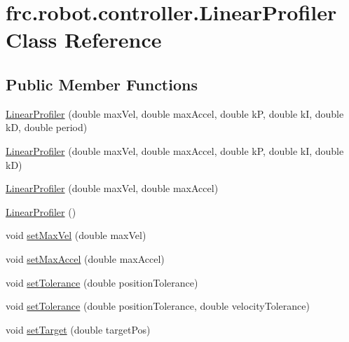 \hypertarget{classfrc_1_1robot_1_1controller_1_1_linear_profiler}{}\section{frc.\+robot.\+controller.\+Linear\+Profiler Class Reference}
\label{classfrc_1_1robot_1_1controller_1_1_linear_profiler}
\subsection*{Public Member Functions}
\begin{DoxyCompactItemize}
\item 
\mbox{\hyperlink{classfrc_1_1robot_1_1controller_1_1_linear_profiler_a1e7aab755a295a55c3753e77f5b0bdcd}{Linear\+Profiler}} (double max\+Vel, double max\+Accel, double kP, double kI, double kD, double period)
\item 
\mbox{\hyperlink{classfrc_1_1robot_1_1controller_1_1_linear_profiler_a2e9710450fc8f85c4afdf3829cdc9b2f}{Linear\+Profiler}} (double max\+Vel, double max\+Accel, double kP, double kI, double kD)
\item 
\mbox{\hyperlink{classfrc_1_1robot_1_1controller_1_1_linear_profiler_a4e604d041cf77ca66a712ec3c71dc470}{Linear\+Profiler}} (double max\+Vel, double max\+Accel)
\item 
\mbox{\hyperlink{classfrc_1_1robot_1_1controller_1_1_linear_profiler_aefed5cdaea96776a06cc5d20088bb2fc}{Linear\+Profiler}} ()
\item 
void \mbox{\hyperlink{classfrc_1_1robot_1_1controller_1_1_linear_profiler_a4c9134a6d34c837608dd45bbef48ef85}{set\+Max\+Vel}} (double max\+Vel)
\item 
void \mbox{\hyperlink{classfrc_1_1robot_1_1controller_1_1_linear_profiler_ae9d63223b6aae0d5d15a996ff31b6696}{set\+Max\+Accel}} (double max\+Accel)
\item 
void \mbox{\hyperlink{classfrc_1_1robot_1_1controller_1_1_linear_profiler_ab8a903a8ae6c3a3cf6f1f830c0bae628}{set\+Tolerance}} (double position\+Tolerance)
\item 
void \mbox{\hyperlink{classfrc_1_1robot_1_1controller_1_1_linear_profiler_ad7b7203deb6b79d10de0f50c1822f68d}{set\+Tolerance}} (double position\+Tolerance, double velocity\+Tolerance)
\item 
void \mbox{\hyperlink{classfrc_1_1robot_1_1controller_1_1_linear_profiler_a166c2d4dce639d17bff63776a54cd981}{set\+Target}} (double target\+Pos)
\item 

\end{DoxyCompactItemize}

